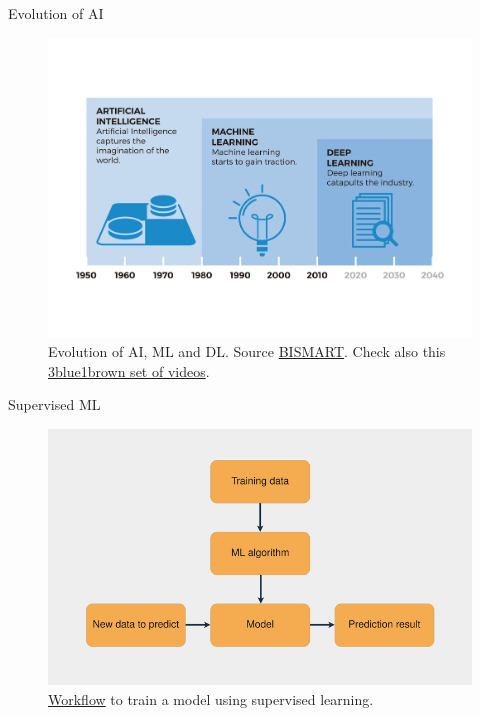 \documentclass{beamer}
\begin{document}
\begin{frame}{Evolution of AI}
    \begin{figure}
        \includegraphics[width=0.8\linewidth]{MLDLevol}
        \caption{Evolution of AI, ML and DL. Source \href{https://blog.bismart.com/diferencia-machine-learning-deep-learning}{BISMART}. Check also this \href{https://www.3blue1brown.com/topics/neural-networks}{3blue1brown set of videos}.}
        \label{Fig:MLDLevol}
    \end{figure}
\end{frame}

\begin{frame}{Supervised ML}
    \begin{figure}
        \includegraphics[width=0.9\linewidth]{ML}
        \caption{\href{https://realpython.com/python-ai-neural-network/}{Workflow} to train a model using supervised learning.}
        \label{Fig:ML}
    \end{figure}
\end{frame}
\end{document}
